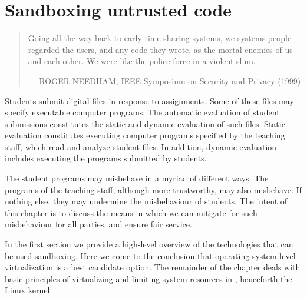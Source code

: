 
\chapter{Sandboxing untrusted code}

\begin{quotation}

\footnotesize\sffamily\itshape

\begin{flushright}

Going all the way back to early time-sharing systems, we systems people
regarded the users, and any code they wrote, as the mortal enemies of us and
each other. We were like the police force in a violent slum.

\smallbreak

\upshape

--- ROGER NEEDHAM, IEEE Symposium on Security and Privacy (1999)

\end{flushright}

\end{quotation}

Students submit digital files in response to assignments. Some of these files
may specify executable computer programs. The automatic evaluation of student
submissions constitutes the static and dynamic evaluation of such files. Static
evaluation constitutes executing computer programs specified by the teaching
staff, which read and analyze student files. In addition, dynamic evaluation
includes executing the programs submitted by students.

The student programs may misbehave in a myriad of different ways. The programs
of the teaching staff, although more trustworthy, may also misbehave. If
nothing else, they may undermine the misbehaviour of students. The intent of
this chapter is to discuss the means in which we can mitigate for such
misbehaviour for all parties, and ensure fair service.

In the first section we provide a high-level overview of the technologies that
can be used sandboxing. Here we come to the conclusion that operating-system
level virtualization is a best candidate option. The remainder of the chapter
deals with basic principles of virtualizing and limiting system resources in
\cite{linux-kernel-v3.14.2}, henceforth the Linux kernel.













